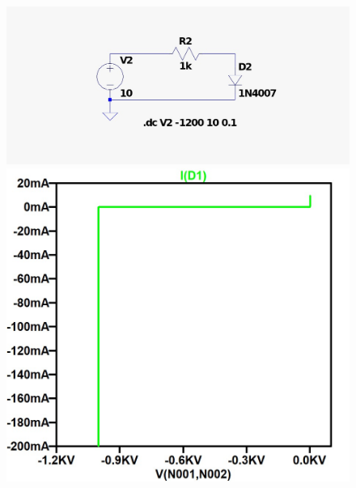 \documentclass[chaptersright]{informeutn}
\begin{document}
    \begin{figure}[H]
      \centering
      \begin{minipage}{0.45\textwidth}
        \centering
        \includegraphics[width=\linewidth]{pictures/circuito_diodo_silicio_inversa.jpeg}
      \end{minipage}
      \hfill
      \begin{minipage}{0.45\textwidth}
        \centering
        \includegraphics[width=\linewidth]{pictures/curva_diodo_silicio_inversa.jpeg}
      \end{minipage}
    \end{figure}
\end{document}
